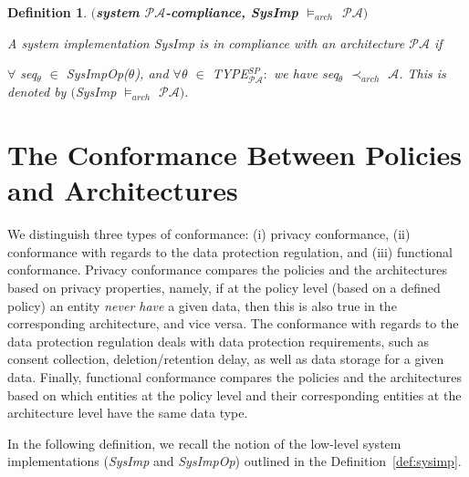 \documentclass[a4paper]{article}
\newtheorem{ttd}{Definition}
\begin{document}
\begin{ttd}$($\textbf{system $\mathcal{P}\mathcal{A}$-compliance, \textit{SysImp} $\models_{arch}$ $\mathcal{P}\mathcal{A}$}$)$

\noindent A system implementation \textit{SysImp} is in compliance with an architecture $\mathcal{P}$$\mathcal{A}$ if 

$\forall$ \textit{seq}$_{\theta}$ $\in$ \textit{SysImpOp($\theta$)}, and  $\forall$$\theta$ $\in$ \textit{TYPE}$^{SP}_{\mathcal{P}\mathcal{A}}$$:$  we have \textit{seq}$_{\theta}$ $\prec_{arch}$ $\mathcal{A}$. This is denoted by $($\textit{SysImp} $\models_{arch}$ $\mathcal{P}\mathcal{A}$$)$.   
\end{ttd}


\section{The Conformance Between Policies and Architectures}
\label{conformance} 
We distinguish three types of conformance: (i) privacy conformance, (ii) conformance with regards to the data protection regulation, and (iii) functional conformance. Privacy conformance compares the policies and the architectures based on privacy properties, namely, if at the policy level (based on a defined policy) an entity \textit{never have} a given data, then this is also true in the corresponding architecture, and vice versa. The conformance with regards to the data protection regulation deals with data protection requirements, such as consent collection, deletion/retention delay, as well as data storage for a given data. Finally, functional conformance compares the policies and the architectures based on which entities at the policy level and their corresponding entities at the architecture level have the same data type. 

In the following definition, we recall the notion of the low-level system implementations (\textit{SysImp} and \textit{SysImpOp}) outlined in the Definition~\ref{def:sysimp}.
\end{document}
